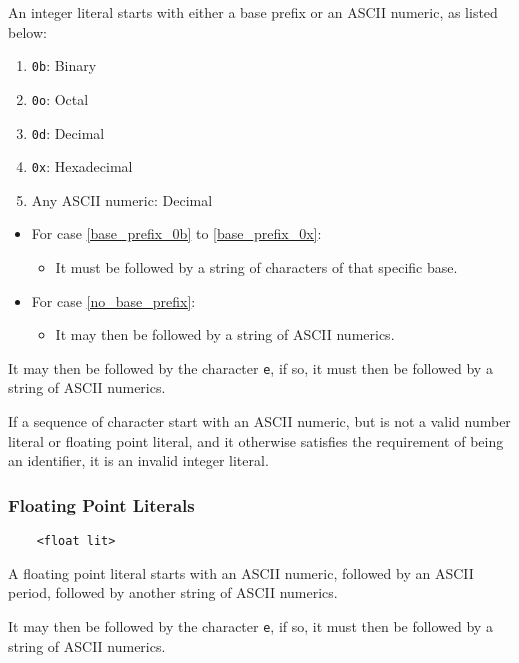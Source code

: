 \documentclass[a4paper]{article}
\begin{document}
An integer literal starts with either a base prefix or an ASCII numeric, as listed below:

\begin{enumerate}
    \item \verb|0b|: Binary
        \label{base_prefix_0b}
    \item \verb|0o|: Octal
    \item \verb|0d|: Decimal
    \item \verb|0x|: Hexadecimal
        \label{base_prefix_0x}
    \item Any ASCII numeric: Decimal
        \label{no_base_prefix}
\end{enumerate}

\begin{itemize}
    \item For case \ref{base_prefix_0b} to \ref{base_prefix_0x}:
    \begin{itemize}
        \item It must be followed by a string of characters of that specific base.
    \end{itemize}
    \item For case \ref{no_base_prefix}:
    \begin{itemize}
        \item It may then be followed by a string of ASCII numerics.
    \end{itemize}
\end{itemize}

It may then be followed by the character \verb|e|, if so, it must then be followed by a string of ASCII numerics.

If a sequence of character start with an ASCII numeric, but is not a valid number literal or floating point literal, and it otherwise satisfies the requirement of being an identifier, it is an invalid integer literal.

\subsubsection{Floating Point Literals}

\begin{verbatim}
    <float lit>
\end{verbatim}

A floating point literal starts with an ASCII numeric, followed by an ASCII period, followed by another string of ASCII numerics.

It may then be followed by the character \verb|e|, if so, it must then be followed by a string of ASCII numerics.
\end{document}

